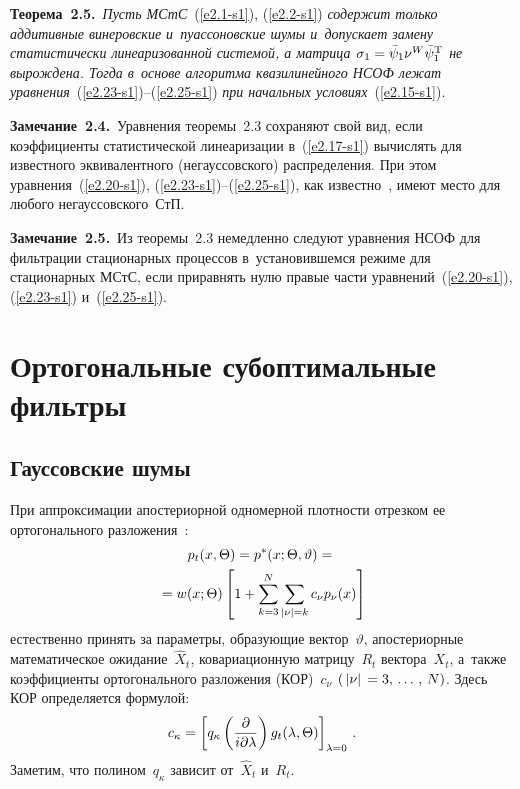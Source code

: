 \begin{multicols}{2}

\noindent
\textbf{Теорема~2.5.}\ \textit{Пусть МСтС}~(\ref{e2.1-s1}), (\ref{e2.2-s1}) 
\textit{содержит только
аддитивные винеровские и~пуассоновские шумы и~допускает замену
статистически линеаризованной системой, а матрица $\si_1
\hm=\bar\psi_1 \nu^W \bar\psi_1^{\mathrm{T}}$ не вырождена. Тогда в~основе
алгоритма квазилинейного НСОФ лежат уравнения}~(\ref{e2.23-s1})--(\ref{e2.25-s1}) \textit{при
начальных условиях}~(\ref{e2.15-s1}).

\smallskip 

\noindent
\textbf{Замечание~2.4.}\
Уравнения теоремы~2.3 сохраняют свой вид, если коэффициенты статистической 
линеаризации в~(\ref{e2.17-s1}) вычислять для известного эквивалентного 
(негауссовского) распределения. При этом уравнения~(\ref{e2.20-s1}), 
(\ref{e2.23-s1})--(\ref{e2.25-s1}), как известно~\cite{7-s1}, 
имеют место для любого негауссовского~СтП.


\smallskip

\noindent
\textbf{Замечание~2.5.}\
Из теоремы~2.3 немедленно следуют уравнения НСОФ для фильтрации стационарных 
процессов в~установившемся режиме для стационарных МСтС, если приравнять нулю правые 
части уравнений~(\ref{e2.20-s1}), (\ref{e2.23-s1}) и~(\ref{e2.25-s1}).

\section{Ортогональные субоптимальные фильтры}

\subsection{Гауссовские шумы}

При аппроксимации апостериорной одномерной плотности отрезком ее ортогонального 
разложения~\cite{1-s1, 2-s1}:
\begin{multline}
p_t (x, \Theta)= p^* (x; \Theta, \vartheta) ={}\\
{}= w (x; \Theta) 
\left[ 1+ \sum\limits_{k=3}^N \sum\limits_{|\nu | =k} c_\nu p_\nu (x)\right]
\label{e3.1-s1}
\end{multline}
естественно принять за параметры,
 образующие вектор~$\vartheta$, апостериорные математическое
 ожидание~$\hat X_t$, ковариационную матрицу~$R_t$ вектора~$X_t$, а~так\-же
 коэффициенты ортогонального разложения (КОР)~$c_\nu$ $(\lv \nu\rv \hm= 3\tr N)$.
 Здесь КОР определяется формулой:
\begin{equation}
c_\kappa = \left[ q_\kappa \left(\displaystyle\frac{\displaystyle \partial\mathstrut}{\displaystyle i\partial \lambda\mathstrut}\right) 
g_t (\lambda,\Theta)\right]_{\lambda=0}\,.\label{e3.2-s1}
\end{equation}
Заметим, что полином~$q_\kappa$ зависит от~$\hat X_t$ и~$R_t$.


\end{multicols}
